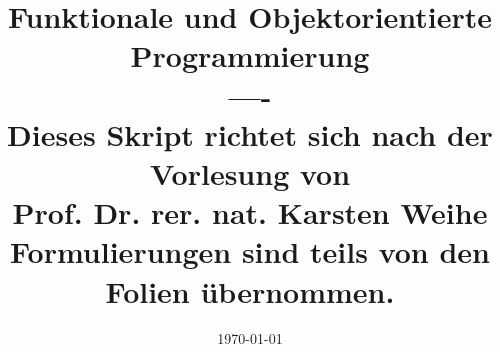 \documentclass[a4paper,12pt,liststotoc, parskip=half]{scrreprt}
\begin{document}
    \pagestyle{fancy}

    \title{
      Funktionale und Objektorientierte Programmierung\\
      \large ---- \\Dieses Skript richtet sich nach der Vorlesung von \\ Prof. Dr. rer. nat. Karsten Weihe \\ Formulierungen sind teils von den Folien übernommen.}

    \date{\today}
    \maketitle
    \pagestyle{fancy}
    \lhead{ }
    \chead{\leftmark}
    \rhead{}

    \cfoot{\thepage}
    \rfoot{ %
    \date{\today} }

    \begingroup
      \renewcommand*{\chapterpagestyle}{empty}
      \pagestyle{empty}
      \tableofcontents
    \endgroup


    \clearpage

    
    
    
    
		
    \appendix

    
\end{document}
